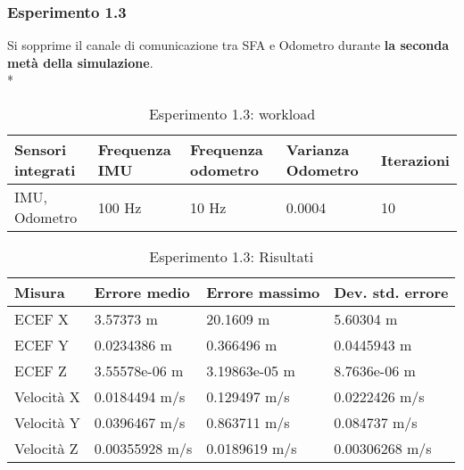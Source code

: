 \subsubsection{Esperimento 1.3}
Si sopprime il canale di comunicazione tra SFA e Odometro durante \textbf{la seconda met\`a della simulazione}.\\* 
\begin{table}[h]
	\centering
\begin{tabular}{|p{3.25cm}|p{2cm}|p{2cm}|p{2cm}|p{2cm}|}
	\hline 
	\textbf{Sensori integrati} & \textbf{Frequenza IMU}  & \textbf{Frequenza odometro} & \textbf{Varianza Odometro} & \textbf{Iterazioni} \\ 
	\hline 
	IMU, Odometro & 100 Hz & 10 Hz & 0.0004 & 10 \\
	\hline 
\end{tabular}
	\caption{Esperimento 1.3: workload}
\end{table}
\begin{table}[h]
	\centering
	\begin{tabular}{|p{2cm}|p{3.2cm}|p{3cm}|p{3cm}|}
	\hline 
	\textbf{Misura} 
	& \textbf{Errore medio} 
	& \textbf{Errore massimo}
	& \textbf{Dev. std. errore}\\ 
	\hline 
	ECEF X & 3.57373 m & 20.1609 m & 5.60304 m \\ 
	\hline 
	ECEF Y & 0.0234386 m & 0.366496 m & 0.0445943 m \\ 
	\hline 
	ECEF Z & 3.55578e-06 m & 3.19863e-05 m & 8.7636e-06 m \\ 
	\hline 
	Velocit\`a X & 0.0184494 m/s & 0.129497 m/s & 0.0222426 m/s \\ 
	\hline 
	Velocit\`a Y & 0.0396467 m/s & 0.863711 m/s & 0.084737 m/s \\ 
	\hline 
	Velocit\`a Z & 0.00355928 m/s & 0.0189619 m/s & 0.00306268 m/s \\ 
	\hline 
\end{tabular} 
	\caption{Esperimento 1.3: Risultati}
\end{table}
